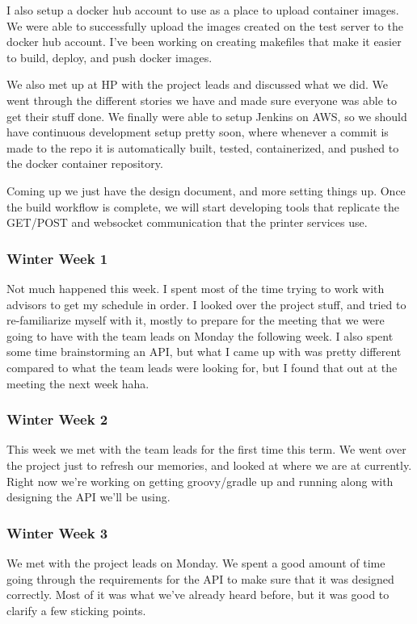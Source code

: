 \documentclass[onecolumn, draftclsnofoot,10pt, compsoc]{IEEEtran}
\begin{document}
I also setup a docker hub account to use as a place to upload container images.
We were able to successfully upload the images created on the test server to the docker hub account.
I've been working on creating makefiles that make it easier to build, deploy, and push docker images.

We also met up at HP with the project leads and discussed what we did.
We went through the different stories we have and made sure everyone was able to get their stuff done.
We finally were able to setup Jenkins on AWS, so we should have continuous development setup pretty soon, where whenever a commit is made to the repo it is automatically built, tested, containerized, and pushed to the docker container repository.

Coming up we just have the design document, and more setting things up.  Once the build workflow is complete, we will start developing tools that replicate the GET/POST and websocket communication that the printer services use.

\subsubsection*{Winter Week 1}
Not much happened this week.  I spent most of the time trying to work with advisors to get my schedule in order.
I looked over the project stuff, and tried to re-familiarize myself with it, mostly to prepare for the meeting that we were going to have with the team leads on Monday the following week.
I also spent some time brainstorming an API, but what I came up with was pretty different compared to what the team leads were looking for, but I found that out at the meeting the next week haha.

\subsubsection*{Winter Week 2}
This week we met with the team leads for the first time this term.
We went over the project just to refresh our memories, and looked at where we are at currently.
Right now we're working on getting groovy/gradle up and running along with designing the API we'll be using.

\subsubsection*{Winter Week 3}
We met with the project leads on Monday.
We spent a good amount of time going through the requirements for the API to make sure that it was designed correctly.
Most of it was what we've already heard before, but it was good to clarify a few sticking points.
\end{document}
